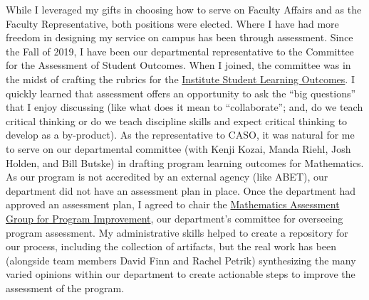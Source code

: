 \documentclass[
  letterpaper,
  DIV=11,
  numbers=noendperiod]{scrreprt}
\begin{document}
While I leveraged my gifts in choosing how to serve on Faculty Affairs
and as the Faculty Representative, both positions were elected. Where I
have had more freedom in designing my service on campus has been through
assessment. Since the Fall of 2019, I have been our departmental
representative to the Committee for the Assessment of Student Outcomes.
When I joined, the committee was in the midst of crafting the rubrics
for the
\href{https://rosehulman-my.sharepoint.com/personal/trachten_rose-hulman_edu/_layouts/15/onedrive.aspx?id=\%2Fpersonal\%2Ftrachten_rose-hulman_edu\%2FDocuments\%2FShared\%20with\%20everyone\%2FResources\%20for\%20faculty\%20and\%20staff\%2FInstitute\%20Student\%20Learning\%20Outcomes\%2F2020-21\%20CASO\%20Rubrics\%2Epdf&parent=\%2Fpersonal\%2Ftrachten_rose-hulman_edu\%2FDocuments\%2FShared\%20with\%20everyone\%2FResources\%20for\%20faculty\%20and\%20staff\%2FInstitute\%20Student\%20Learning\%20Outcomes&originalPath=aHR0cHM6Ly9yb3NlaHVsbWFuLW15LnNoYXJlcG9pbnQuY29tLzpiOi9nL3BlcnNvbmFsL3RyYWNodGVuX3Jvc2UtaHVsbWFuX2VkdS9FY3lqN19yREVQaEhuakFoR0ZyZ0Z2SUJpRmpyT0dmVmxIUTZfaC1NbGVJRXdRP3J0aW1lPWE1MmpfTy1VMlVn}{Institute
Student Learning Outcomes}. I quickly learned that assessment offers an
opportunity to ask the ``big questions'' that I enjoy discussing (like
what does it mean to ``collaborate''; and, do we teach critical thinking
or do we teach discipline skills and expect critical thinking to develop
as a by-product). As the representative to CASO, it was natural for me
to serve on our departmental committee (with Kenji Kozai, Manda Riehl,
Josh Holden, and Bill Butske) in drafting program learning outcomes for
Mathematics. As our program is not accredited by an external agency
(like ABET), our department did not have an assessment plan in place.
Once the department had approved an assessment plan, I agreed to chair
the
\href{https://moodle.rose-hulman.edu/course/view.php?id=83104}{Mathematics
Assessment Group for Program Improvement}, our department's committee
for overseeing program assessment. My administrative skills helped to
create a repository for our process, including the collection of
artifacts, but the real work has been (alongside team members David Finn
and Rachel Petrik) synthesizing the many varied opinions within our
department to create actionable steps to improve the assessment of the
program.
\end{document}
